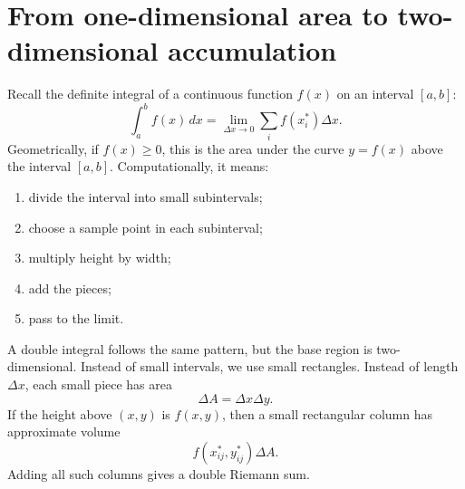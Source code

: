 \documentclass[11pt]{article}
\newcommand{\dd}{\,d}
\begin{document}
\section{From one-dimensional area to two-dimensional accumulation}

Recall the definite integral of a continuous function $f(x)$ on an interval $[a,b]$:
\[
\int_a^b f(x)\dd x=\lim_{\Delta x\to 0}\sum_i f(x_i^*)\Delta x.
\]
Geometrically, if $f(x)\ge 0$, this is the area under the curve $y=f(x)$ above the interval $[a,b]$. Computationally, it means:
\begin{enumerate}
  \item divide the interval into small subintervals;
  \item choose a sample point in each subinterval;
  \item multiply height by width;
  \item add the pieces;
  \item pass to the limit.
\end{enumerate}

A double integral follows the same pattern, but the base region is two-dimensional. Instead of small intervals, we use small rectangles. Instead of length $\Delta x$, each small piece has area
\[
\Delta A=\Delta x\Delta y.
\]
If the height above $(x,y)$ is $f(x,y)$, then a small rectangular column has approximate volume
\[
f(x_{ij}^*,y_{ij}^*)\Delta A.
\]
Adding all such columns gives a double Riemann sum.
\end{document}
